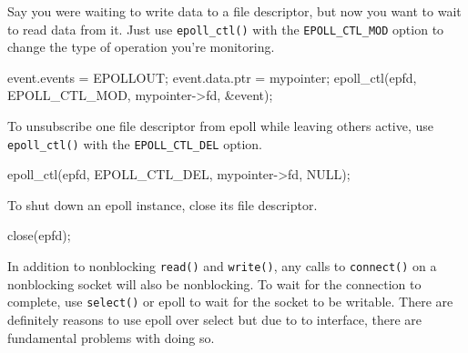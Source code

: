 \documentclass[]{article}
\newenvironment{Shaded}{}{}
\newcommand{\KeywordTok}[1]{\textcolor[rgb]{0.00,0.44,0.13}{\textbf{{#1}}}}
\newcommand{\DataTypeTok}[1]{\textcolor[rgb]{0.56,0.13,0.00}{{#1}}}
\newcommand{\DecValTok}[1]{\textcolor[rgb]{0.25,0.63,0.44}{{#1}}}
\newcommand{\CharTok}[1]{\textcolor[rgb]{0.25,0.44,0.63}{{#1}}}
\newcommand{\StringTok}[1]{\textcolor[rgb]{0.25,0.44,0.63}{{#1}}}
\newcommand{\NormalTok}[1]{{#1}}
\begin{document}
\begin{Shaded}
\end{Shaded}

Say you were waiting to write data to a file descriptor, but now you
want to wait to read data from it. Just use \texttt{epoll\_ctl()} with
the \texttt{EPOLL\_CTL\_MOD} option to change the type of operation
you're monitoring.

\begin{Shaded}
\begin{Highlighting}[]
\NormalTok{event.events = EPOLLOUT;}
\NormalTok{event.data.ptr = mypointer;}
\NormalTok{epoll_ctl(epfd, EPOLL_CTL_MOD, mypointer->fd, &event);}
\end{Highlighting}
\end{Shaded}

To unsubscribe one file descriptor from epoll while leaving others
active, use \texttt{epoll\_ctl()} with the \texttt{EPOLL\_CTL\_DEL}
option.

\begin{Shaded}
\begin{Highlighting}[]
\NormalTok{epoll_ctl(epfd, EPOLL_CTL_DEL, mypointer->fd, NULL);}
\end{Highlighting}
\end{Shaded}

To shut down an epoll instance, close its file descriptor.

\begin{Shaded}
\begin{Highlighting}[]
\NormalTok{close(epfd);}
\end{Highlighting}
\end{Shaded}

In addition to nonblocking \texttt{read()} and \texttt{write()}, any
calls to \texttt{connect()} on a nonblocking socket will also be
nonblocking. To wait for the connection to complete, use
\texttt{select()} or epoll to wait for the socket to be writable. There
are definitely reasons to use epoll over select but due to to interface,
there are fundamental problems with doing so.
\end{document}
